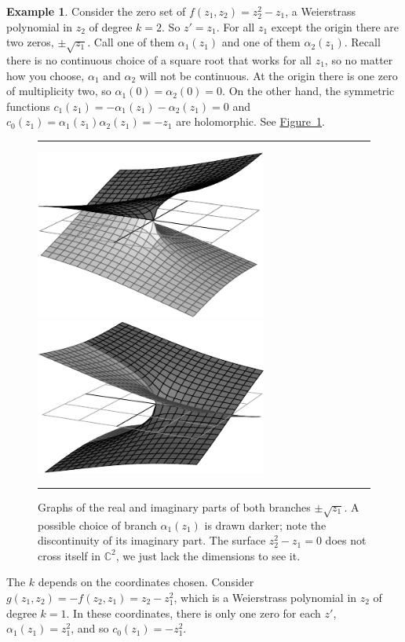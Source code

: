 \documentclass[12pt,openany]{book}
\newcommand{\C}{{\mathbb{C}}}
\theoremstyle{plain}
\theoremstyle{remark}
\theoremstyle{definition}
\newenvironment{myfig}{%
\begin{figure}[h!t]
\noindent\rule{\textwidth}{0.5pt}\vspace{12pt}\par\centering}%
{\par\noindent\rule{\textwidth}{0.5pt}
\end{figure}}
\theoremstyle{exercise}
\theoremstyle{example}
\newtheorem{example}[thm]{Example}
\newcommand{\figureref}[1]{\hyperref[#1]{Figure~\ref*{#1}}}
\begin{document}
\begin{example} \label{sqrt:example}
Consider the zero set of
$f(z_1,z_2) = z_2^2 - z_1$,
a Weierstrass polynomial in $z_2$ of degree $k=2$.  So $z' = z_1$.
For all $z_1$ except the origin there are two zeros, $\pm \sqrt{z_1}$.
Call one of them $\alpha_1(z_1)$ and one of them $\alpha_2(z_1)$.  Recall
there is no continuous choice of a square root that works for all $z_1$,
so no matter how you choose, $\alpha_1$ and $\alpha_2$ will not be continuous.
At the origin there is one zero of multiplicity two,
so $\alpha_1(0) = \alpha_2(0) = 0$.
On the other hand, the
symmetric functions $c_1(z_1) = - \alpha_1(z_1) - \alpha_2(z_1) = 0$
and $c_0(z_1) = \alpha_1(z_1)\alpha_2(z_1) = -z_1$ are holomorphic.
See \figureref{fig:sqrt}.

\begin{myfig}
\includegraphics[align=c,width=3.0in]{figures/realsqrt.pdf}
\hspace{\fill}
\includegraphics[align=c,width=3.0in]{figures/imagsqrt.pdf}
\caption{Graphs of the real and imaginary parts of both branches
$\pm\sqrt{z_1}$.  A possible choice of branch $\alpha_1(z_1)$ is drawn darker; note the
discontinuity of its imaginary part.
The surface $z_2^2-z_1=0$ does not cross itself in $\C^2$,
we just lack the dimensions to see it.\label{fig:sqrt}}
\end{myfig}

The $k$ depends on the coordinates chosen.
Consider $g(z_1,z_2) = -f(z_2,z_1) = z_2-z_1^2$,
which is a Weierstrass polynomial in $z_2$ of degree $k=1$.
In these coordinates, there is only one zero for each $z'$,
$\alpha_1(z_1) = z_1^2$, and so $c_0(z_1) =
-z_1^2$.
\end{example}
\end{document}
